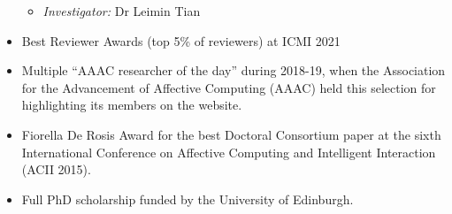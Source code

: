 \documentclass[11pt,letterpaper]{article}
\begin{document}
\begin{itemize}
\begin{itemize}
    \item \emph{Investigator:} Dr Leimin Tian
  \end{itemize}
  \item Best Reviewer Awards (top 5\% of reviewers) at ICMI 2021
  \item Multiple ``AAAC researcher of the day'' during 2018-19, when the Association for the Advancement of Affective Computing (AAAC) held this selection for highlighting its members on the website.
  \item Fiorella De Rosis Award for the best Doctoral Consortium paper at the sixth International Conference on Affective Computing and Intelligent Interaction (ACII 2015).
  \item Full PhD scholarship funded by the University of Edinburgh.
\end{itemize}
\end{document}

